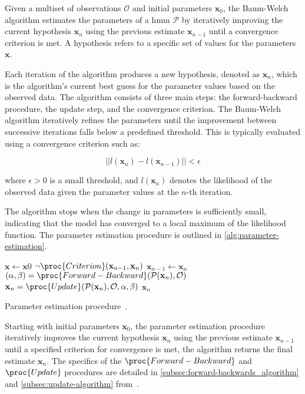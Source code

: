 Given a multiset of observations $\mathcal{O}$ and initial parameters $\textbf{x}_0$, the Baum-Welch algorithm estimates the parameters of a \gls{hmm} $\mathcal{P}$ by iteratively improving the current hypothesis $\textbf{x}_n$ using the previous estimate $\textbf{x}_{n-1}$ until a convergence criterion is met.
A hypothesis refers to a specific set of values for the parameters $\mathbf{x}$.

Each iteration of the algorithm produces a new hypothesis, denoted as $\textbf{x}_n$, which is the algorithm's current best guess for the parameter values based on the observed data.
The algorithm consists of three main steps: the forward-backward procedure, the update step, and the convergence criterion.
The Baum-Welch algorithm iteratively refines the parameters until the improvement between successive iterations falls below a predefined threshold.
This is typically evaluated using a convergence criterion such as:

\begin{equation}
    ||l(\textbf{x}_n) - l(\textbf{x}_{n-1})|| < \epsilon\label{eq:convergence-criterion}
\end{equation}

where $\epsilon > 0$ is a small threshold, and $l(\textbf{x}_n)$ denotes the likelihood of the observed data given the parameter values at the $n$-th iteration.

The algorithm stops when the change in parameters is sufficiently small, indicating that the model has converged to a local maximum of the likelihood function.
The parameter estimation procedure is outlined in \autoref{alg:parameter-estimation}.

\begin{algorithm}[htb!]
    \begin{codebox}
        \li $\mathbf{x} \gets \mathbf{x}0$
        \li \While $\neg\proc{Criterion}(\mathbf{x}_{n-1}, \mathbf{x}_n)$
        \li \Do $\mathbf{x}_{n - 1} \gets \mathbf{x}_n$
        \li $(\alpha, \beta) = \proc{Forward-Backward}(\mathcal{P}(\mathbf{x}_n), \mathcal{O})$
        \li $\mathbf{x}_n = \proc{Update}(\mathcal{P}(\mathbf{x}_n), \mathcal{O}, \alpha, \beta)$ \End
        \li \Return $\mathbf{x}_n$
    \end{codebox}
    \caption{Parameter estimation procedure~\cite{p7}.}
    \label{alg:parameter-estimation}
\end{algorithm}

Starting with initial parameters $\mathbf{x}_0$, the parameter estimation procedure iteratively improves the current hypothesis $\mathbf{x}_n$ using the previous estimate $\mathbf{x}_{n-1}$ until a specified criterion for convergence is met, the algorithm returns the final estimate $\mathbf{x}_n$.
The specifics of the $\proc{Forward-Backward}$ and $\proc{Update}$ procedures are detailed in \autoref{subsec:forward-backwards_algorithm} and \autoref{subsec:update-algorithm} from~\cite{baum1970maximization}.

